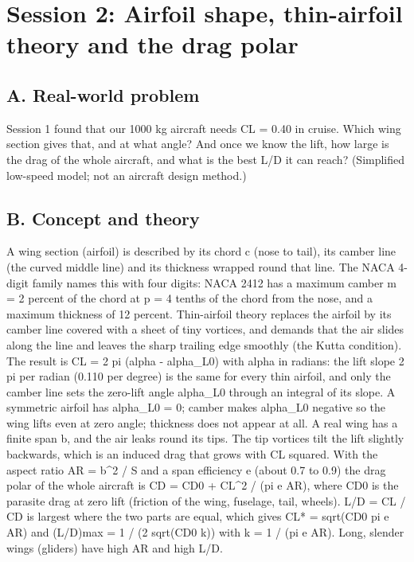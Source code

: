 \documentclass[11pt,a4paper]{article}
\begin{document}
\section{Session 2: Airfoil shape, thin-airfoil theory and the drag polar}

\subsection*{A. Real-world problem}
Session 1 found that our 1000 kg aircraft needs CL = 0.40 in cruise. Which wing section gives that, and at what angle? And once we know the lift, how large is the drag of the whole aircraft, and what is the best L/D it can reach? (Simplified low-speed model; not an aircraft design method.)

\subsection*{B. Concept and theory}
A wing section (airfoil) is described by its chord c (nose to tail), its camber line (the curved middle line) and its thickness wrapped round that line. The NACA 4-digit family names this with four digits: NACA 2412 has a maximum camber m = 2 percent of the chord at p = 4 tenths of the chord from the nose, and a maximum thickness of 12 percent. Thin-airfoil theory replaces the airfoil by its camber line covered with a sheet of tiny vortices, and demands that the air slides along the line and leaves the sharp trailing edge smoothly (the Kutta condition). The result is CL = 2 pi (alpha - alpha\_L0) with alpha in radians: the lift slope 2 pi per radian (0.110 per degree) is the same for every thin airfoil, and only the camber line sets the zero-lift angle alpha\_L0 through an integral of its slope. A symmetric airfoil has alpha\_L0 = 0; camber makes alpha\_L0 negative so the wing lifts even at zero angle; thickness does not appear at all. A real wing has a finite span b, and the air leaks round its tips. The tip vortices tilt the lift slightly backwards, which is an induced drag that grows with CL squared. With the aspect ratio AR = b\textasciicircum{}2 / S and a span efficiency e (about 0.7 to 0.9) the drag polar of the whole aircraft is CD = CD0 + CL\textasciicircum{}2 / (pi e AR), where CD0 is the parasite drag at zero lift (friction of the wing, fuselage, tail, wheels). L/D = CL / CD is largest where the two parts are equal, which gives CL* = sqrt(CD0 pi e AR) and (L/D)max = 1 / (2 sqrt(CD0 k)) with k = 1 / (pi e AR). Long, slender wings (gliders) have high AR and high L/D.
\end{document}
